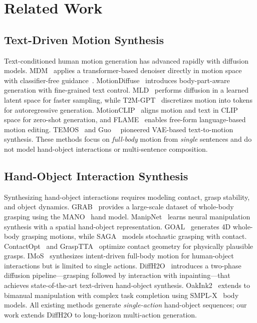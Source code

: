 \documentclass[runningheads]{llncs}
\begin{document}
\section{Related Work}
\label{sec:related}

\subsection{Text-Driven Motion Synthesis}
Text-conditioned human motion generation has advanced rapidly with diffusion models.
MDM~\cite{tevet2023human} applies a transformer-based denoiser directly in motion space with classifier-free guidance~\cite{ho2022classifier}.
MotionDiffuse~\cite{zhang2022motiondiffuse} introduces body-part-aware generation with fine-grained text control.
MLD~\cite{chen2023executing} performs diffusion in a learned latent space for faster sampling, while T2M-GPT~\cite{zhang2023t2mgpt} discretizes motion into tokens for autoregressive generation.
MotionCLIP~\cite{tevet2022motionclip} aligns motion and text in CLIP~\cite{radford2021learning} space for zero-shot generation, and FLAME~\cite{kim2023flame} enables free-form language-based motion editing.
TEMOS~\cite{petrovich2022temos} and Guo~\etal~\cite{guo2022generating} pioneered VAE-based text-to-motion synthesis.
These methods focus on \emph{full-body} motion from \emph{single} sentences and do not model hand-object interactions or multi-sentence composition.

\subsection{Hand-Object Interaction Synthesis}
Synthesizing hand-object interactions requires modeling contact, grasp stability, and object dynamics.
GRAB~\cite{taheri2020grab} provides a large-scale dataset of whole-body grasping using the MANO~\cite{romero2022mano} hand model.
ManipNet~\cite{zhang2021manipnet} learns neural manipulation synthesis with a spatial hand-object representation.
GOAL~\cite{taheri2022goal} generates 4D whole-body grasping motions, while SAGA~\cite{wu2022saga} models stochastic grasping with contact.
ContactOpt~\cite{grady2021contactopt} and GraspTTA~\cite{jiang2021graspTTA} optimize contact geometry for physically plausible grasps.
IMoS~\cite{ghosh2023imos} synthesizes intent-driven full-body motion for human-object interactions but is limited to single actions.
DiffH2O~\cite{christen2024diffh2o} introduces a two-phase diffusion pipeline---grasping followed by interaction with inpainting---that achieves state-of-the-art text-driven hand-object synthesis.
OakInk2~\cite{zhan2024oakink2} extends to bimanual manipulation with complex task completion using SMPL-X~\cite{pavlakos2019expressive} body models.
All existing methods generate \emph{single-action} hand-object sequences; our work extends DiffH2O to long-horizon multi-action generation.
\end{document}
